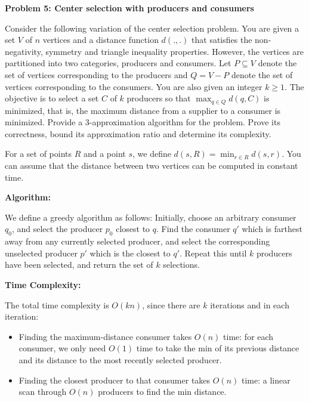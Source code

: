 \documentclass[letterpaper,12pt]{article}
\begin{document}
\pagebreak

\noindent\textbf{Problem 5: Center selection with producers and consumers}

Consider the following variation of the center selection problem. You are given
a set $V$ of $n$ vertices and a distance function $d(.,.)$ that satisfies the
non-negativity, symmetry and triangle inequality properties. However, the
vertices are partitioned into two categories, producers and consumers. Let $P \subseteq
V$ denote the set of vertices corresponding to the producers and $Q = V - P$
denote the set of vertices corresponding to the consumers. You are also given an
integer $k \geq 1$. The objective is to select a set $C$ of $k$ producers so that
$\max_{q \in Q} d(q,C)$ is minimized, that is, the maximum distance from a supplier
to a consumer is minimized. Provide a 3-approximation algorithm for the problem.
Prove its correctness, bound its approximation ratio and determine its
complexity.

For a set of points $R$ and a point $s$, we define $d(s, R) = \min_{r \in R}
d(s,r)$. You can assume that the distance between two vertices can be computed
in constant time.

\vspace{2mm}
\textbf{Algorithm:}

We define a greedy algorithm as follows: Initially, choose an arbitrary consumer
$q_0$, and select the producer $p_0$ closest to $q$. Find the consumer $q'$
which is farthest away from any currently selected producer, and select the
corresponding unselected producer $p'$ which is the closest to $q'$. Repeat this
until $k$ producers have been selected, and return the set of $k$ selections.

\vspace{2mm}
\textbf{Time Complexity:}

The total time complexity is $O(kn)$, since there are $k$ iterations
and in each iteration:

\begin{itemize}
\item Finding the maximum-distance consumer takes $O(n)$ time: for each
  consumer, we only need $O(1)$ time to take the min of its previous distance
  and its distance to the most recently selected producer.
\item Finding the closest producer to that consumer takes $O(n)$ time: a linear
  scan through $O(n)$ producers to find the min distance.
\end{itemize}
\end{document}
